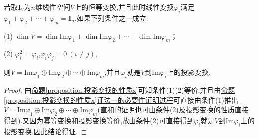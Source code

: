 \documentclass[../../main.tex]{subfiles}%
\begin{document}
\begin{corollary}\label{corollary:恒等变换的幂等分解}
若取\(\boldsymbol{I}_V\)为$n$维线性空间\(V\)上的恒等变换,并且此时线性变换\(\varphi_i\)满足\(\varphi_1+\varphi_2+\cdots+\varphi_m = \boldsymbol{I}_n\).如果下列条件之一成立:

(1) \(\dim V=\dim\text{Im}\varphi_1+\dim\text{Im}\varphi_2+\cdots+\dim\text{Im}\varphi_m\)；

(2) \(\varphi_i^2 = \varphi_i\),\(\varphi_i\varphi_j = 0\ (i\neq j)\),

则\(V = \text{Im}\varphi_1\oplus\text{Im}\varphi_2\oplus\cdots\oplus\text{Im}\varphi_m\),并且\(\varphi_i\)就是\(V\)到\(\text{Im}\varphi_i\)上的投影变换.
\end{corollary}
\begin{proof}
由\hyperref[proposition:投影变换的性质x]{命题\ref{proposition:投影变换的性质x}}可知条件(1)(2)等价,并且由\hyperref[proposition:投影变换的性质x]{命题\ref{proposition:投影变换的性质x}证法一的必要性证明过程}可直接由条件(1)推出\(V = \text{Im}\varphi_1\oplus\text{Im}\varphi_2\oplus\cdots\oplus\text{Im}\varphi_m\)(直和的证明也可由条件(2)及\hyperref[proposition:投影变换的性质]{投影变换的性质}直接得到).又因为\hyperlink{幂等变换和投影变换等价}{幂等变换和投影变换等价},故由条件(2)可直接得到\(\varphi_i\)就是\(V\)到\(\text{Im}\varphi_i\)上的投影变换.因此结论得证.
\end{proof}
\end{document}
